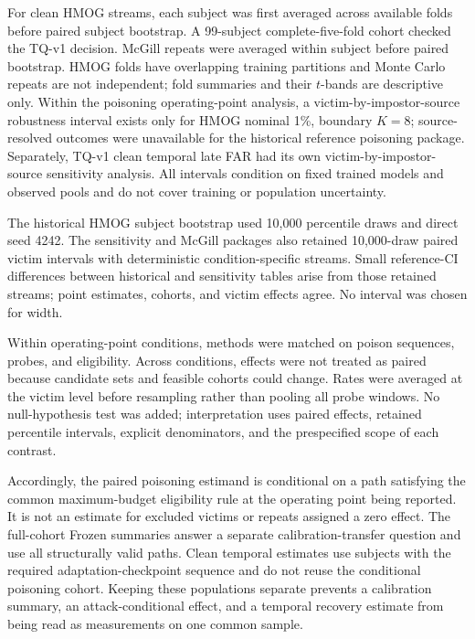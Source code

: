 \documentclass[technologies,article,submit,moreauthors]{Definitions/mdpi}
\begin{document}
For clean HMOG streams, each subject was first averaged across available folds before paired subject bootstrap. A 99-subject complete-five-fold cohort checked the TQ-v1 decision. McGill repeats were averaged within subject before paired bootstrap. HMOG folds have overlapping training partitions and Monte Carlo repeats are not independent; fold summaries and their \(t\)-bands are descriptive only. Within the poisoning operating-point analysis, a victim-by-impostor-source robustness interval exists only for HMOG nominal 1\%, boundary \(K=8\); source-resolved outcomes were unavailable for the historical reference poisoning package. Separately, TQ-v1 clean temporal late FAR had its own victim-by-impostor-source sensitivity analysis. All intervals condition on fixed trained models and observed pools and do not cover training or population uncertainty.

The historical HMOG subject bootstrap used 10,000 percentile draws and direct seed 4242. The sensitivity and McGill packages also retained 10,000-draw paired victim intervals with deterministic condition-specific streams. Small reference-CI differences between historical and sensitivity tables arise from those retained streams; point estimates, cohorts, and victim effects agree. No interval was chosen for width.

Within operating-point conditions, methods were matched on poison sequences, probes, and eligibility. Across conditions, effects were not treated as paired because candidate sets and feasible cohorts could change. Rates were averaged at the victim level before resampling rather than pooling all probe windows. No null-hypothesis test was added; interpretation uses paired effects, retained percentile intervals, explicit denominators, and the prespecified scope of each contrast.

Accordingly, the paired poisoning estimand is conditional on a path satisfying the common maximum-budget eligibility rule at the operating point being reported. It is not an estimate for excluded victims or repeats assigned a zero effect. The full-cohort Frozen summaries answer a separate calibration-transfer question and use all structurally valid paths. Clean temporal estimates use subjects with the required adaptation-checkpoint sequence and do not reuse the conditional poisoning cohort. Keeping these populations separate prevents a calibration summary, an attack-conditional effect, and a temporal recovery estimate from being read as measurements on one common sample.
\end{document}
